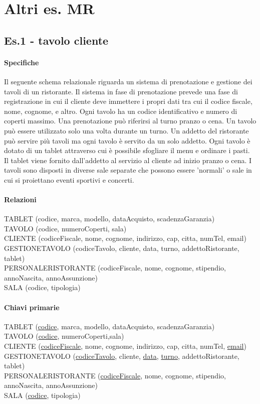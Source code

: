 \chapter{Altri es. MR}
\section{Es.1 - tavolo cliente}
\subsubsection{Specifiche}
Il seguente schema relazionale riguarda un sistema di prenotazione e gestione dei tavoli di un ristorante. Il sistema in fase di prenotazione prevede una fase di registrazione in cui il cliente deve immettere i propri dati tra cui il codice fiscale, nome, cognome, e altro. Ogni tavolo ha un codice identificativo e numero di coperti massimo. Una prenotazione può riferirsi al turno pranzo o cena. Un tavolo può essere utilizzato solo una volta durante un turno. Un addetto del ristorante può servire più tavoli ma ogni tavolo è servito da un solo addetto. Ogni tavolo è dotato di un tablet attraverso cui è possibile sfogliare il menu e ordinare i pasti. Il tablet viene fornito dall'addetto al servizio al cliente ad inizio pranzo o cena. I tavoli sono disposti in diverse sale separate che possono essere 'normali' o sale in cui si proiettano eventi sportivi e concerti.

\subsubsection{Relazioni}
TABLET (codice, marca, modello, dataAcquisto, scadenzaGaranzia)
\\TAVOLO (codice, numeroCoperti, sala)
\\CLIENTE (codiceFiscale, nome, cognome, indirizzo, cap, citta, numTel, email)
\\GESTIONETAVOLO (codiceTavolo, cliente, data, turno, addettoRistorante, tablet)
\\PERSONALERISTORANTE (codiceFiscale, nome, cognome, stipendio, annoNascita, annoAssunzione)
\\SALA (codice, tipologia)

\subsubsection{Chiavi primarie}
TABLET (\underline{codice}, marca, modello, dataAcquisto, scadenzaGaranzia)
\\TAVOLO (\underline{codice}, numeroCoperti,sala)
\\CLIENTE (\underline{codiceFiscale}, nome, cognome, indirizzo, cap, citta, numTel, \underline{email})
\\GESTIONETAVOLO (\underline{codiceTavolo}, cliente, \underline{data}, \underline{turno}, addettoRistorante, tablet)
\\PERSONALERISTORANTE (\underline{codiceFiscale}, nome, cognome, stipendio, annoNascita, annoAssunzione)
\\SALA (\underline{codice}, tipologia)

